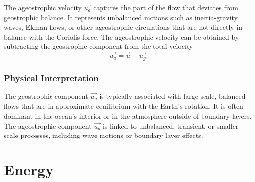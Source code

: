 The ageostrophic velocity $\vec{u_a}$ captures the part of the flow that deviates from geostrophic balance. It represents unbalanced motions such as inertia-gravity waves, Ekman flows, or other ageostrophic circulations that are not directly in balance with the Coriolis force. The ageostrophic velocity can be obtained by subtracting the geostrophic component from the total velocity 
\begin{equation*}
	\vec{u_a} = \vec{u} - \vec{u_g}.
\end{equation*}

\subsubsection{Physical Interpretation}

The geostrophic component $\vec{u_g}$ is typically associated with large-scale, balanced flows that are in approximate equilibrium with the Earth’s rotation. It is often dominant in the ocean’s interior or in the atmosphere outside of boundary layers.
The ageostrophic component $\vec{u_a}$ is linked to unbalanced, transient, or smaller-scale processes, including wave motions or boundary layer effects.

\section{Energy}


